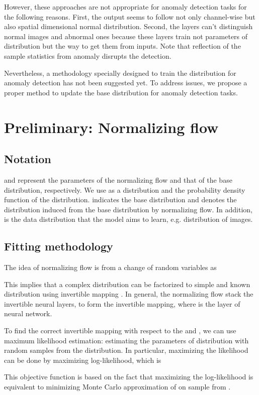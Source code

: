 \documentclass[letterpaper]{article}
\begin{document}
However, these approaches are not appropriate for anomaly detection tasks for the following reasons. First, the output seems to follow not only channel-wise but also spatial dimensional normal distribution. Second, the layers can't distinguish normal images and abnormal ones because these layers train not parameters of distribution but the way to get them from inputs. Note that reflection of the sample statistics from anomaly disrupts the detection.

Nevertheless, a methodology specially designed to train the distribution for anomaly detection has not been suggested yet. To address issues, we propose a proper method to update the base distribution for anomaly detection tasks.

\section{Preliminary: Normalizing flow}
\subsection{Notation}
 and  represent the parameters of the normalizing flow and that of the base distribution, respectively. We use  as a distribution and the probability density function of the distribution.  indicates the base distribution and  denotes the distribution induced from the base distribution by normalizing flow. In addition,  is the data distribution that the model aims to learn, e.g. distribution of images.

\subsection{Fitting methodology}
The idea of normalizing flow is from a change of random variables as

This implies that a complex distribution  can be factorized to simple and known distribution  using invertible mapping . In general, the normalizing flow stack the invertible neural layers,  to form the invertible mapping, where  is the layer of neural network.

To find the correct invertible mapping  with respect to the  and , we can use maximum likelihood estimation: estimating the parameters of distribution with random samples from the distribution. In particular, maximizing the likelihood can be done by maximizing log-likelihood, which is

This objective function is based on the fact that maximizing the log-likelihood is equivalent to minimizing Monte Carlo approximation of  on sample  from  \cite{papamakarios1}.
\end{document}
